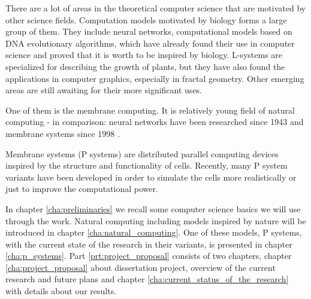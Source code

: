 
There are a lot of areas in the theoretical computer science that are motivated by other science fields. Computation models motivated by biology forms a large group of them. They include neural networks, computational models based on DNA evolutionary algorithms, which have already found their use in computer science and proved that it is worth to be inspired by biology. L-systems are specialized for describing the growth of plants, but they have also found the applications in computer graphics, especially in fractal geometry. Other emerging areas are still awaiting for their more significant uses.

One of them is the membrane computing. It is relatively young field of natural computing - in comparison: neural networks have been researched since 1943 and membrane systems since 1998 \cite{Paun98}.

Membrane systems (P systems) are distributed parallel computing devices inspired by the structure and functionality of cells. Recently, many P system variants have been developed in order to simulate the cells more realistically or just to improve the computational power.

In chapter \ref{cha:preliminaries} we recall some computer science basics we will use through the work.
Natural computing including models inspired by nature will be introduced in chapter \ref{cha:natural_computing}. One of these models, P systems, with the current state of the research in their variants, is presented in chapter \ref{cha:p_systems}. Part \ref{prt:project_proposal} consists of two chapters, chapter \ref{cha:project_proposal} about dissertation project, overview of the current research and future plans and chapter \ref{cha:current_status_of_the_research} with details about our results.